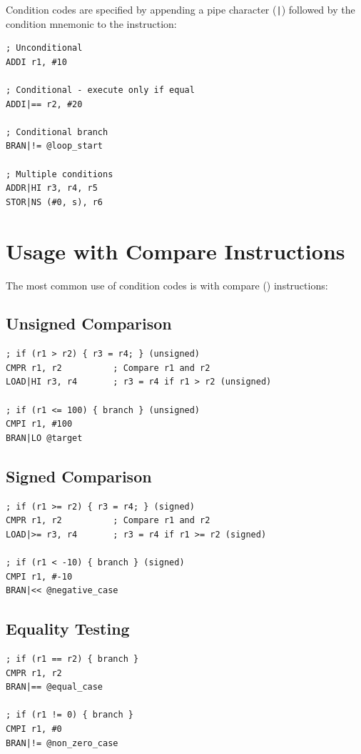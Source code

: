Condition codes are specified by appending a pipe character (\texttt{|}) followed by the condition mnemonic to the
instruction:

\begin{lstlisting}
; Unconditional
ADDI r1, #10

; Conditional - execute only if equal
ADDI|== r2, #20

; Conditional branch
BRAN|!= @loop_start

; Multiple conditions
ADDR|HI r3, r4, r5
STOR|NS (#0, s), r6
\end{lstlisting}

\section{Usage with Compare Instructions}

The most common use of condition codes is with compare () instructions:

\subsection{Unsigned Comparison}

\begin{lstlisting}
; if (r1 > r2) { r3 = r4; } (unsigned)
CMPR r1, r2          ; Compare r1 and r2
LOAD|HI r3, r4       ; r3 = r4 if r1 > r2 (unsigned)

; if (r1 <= 100) { branch } (unsigned)
CMPI r1, #100
BRAN|LO @target
\end{lstlisting}

\subsection{Signed Comparison}

\begin{lstlisting}
; if (r1 >= r2) { r3 = r4; } (signed)
CMPR r1, r2          ; Compare r1 and r2
LOAD|>= r3, r4       ; r3 = r4 if r1 >= r2 (signed)

; if (r1 < -10) { branch } (signed)
CMPI r1, #-10
BRAN|<< @negative_case
\end{lstlisting}

\subsection{Equality Testing}

\begin{lstlisting}
; if (r1 == r2) { branch }
CMPR r1, r2
BRAN|== @equal_case

; if (r1 != 0) { branch }
CMPI r1, #0
BRAN|!= @non_zero_case
\end{lstlisting}

